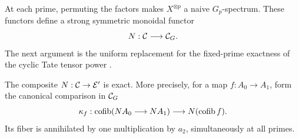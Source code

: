 At each prime, permuting the factors makes $X^{\otimes p}$ a naive
$G_p$-spectrum. These functors define a strong symmetric monoidal
functor
\[
 N:\mathcal C\longrightarrow\mathcal C_G.
\]
The next argument is the uniform replacement for the fixed-prime
exactness of the cyclic Tate tensor power
\cite[Proposition~III.1.1]{NS2018}.

\begin{lemma}
\label{power:exactness}
The composite $N:\mathcal C\to\mathcal E'$ is exact. More precisely, for a map
$f:A_0\to A_1$, form the canonical comparison in $\mathcal C_G$
\[
 \kappa_f:\operatorname{cofib}(NA_0\longrightarrow NA_1)
             \longrightarrow N(\operatorname{cofib} f).
\]
Its fiber is annihilated by one multiplication by $a_2$,
simultaneously at all primes.
\end{lemma}

